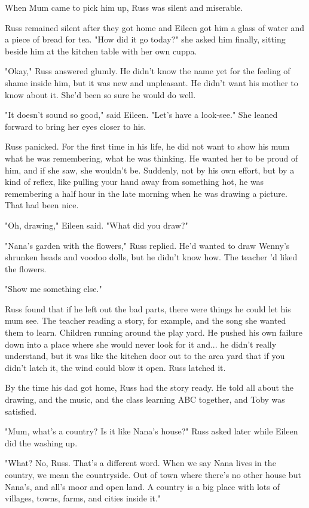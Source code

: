 \documentclass[a4paper,11pt]{article}
\begin{document}
When Mum came to pick him up, Russ was silent and miserable.

Russ remained silent after they got home and Eileen got him a glass of water and a piece of bread for tea. "How did it go today?" she asked him finally, sitting beside him at the kitchen table with her own cuppa.

"Okay," Russ answered glumly. He didn't know the name yet for the feeling of shame inside him, but it was new and unpleasant. He didn't want his mother to know about it. She'd been so sure he would do well.

"It doesn't sound so good," said Eileen. "Let's have a look-see." She leaned forward to bring her eyes closer to his.

Russ panicked. For the first time in his life, he did not want to show his mum what he was remembering, what he was thinking. He wanted her to be proud of him, and if she saw, she wouldn't be. Suddenly, not by his own effort, but by a kind of reflex, like pulling your hand away from something hot, he was remembering a half hour in the late morning when he was drawing a picture. That had been nice.

"Oh, drawing," Eileen said. "What did you draw?"

"Nana's garden with the flowers," Russ replied. He'd wanted to draw Wenny's shrunken heads and voodoo dolls, but he didn't know how. The teacher 'd liked the flowers.

"Show me something else."

Russ found that if he left out the bad parts, there were things he could let his mum see. The teacher reading a story, for example, and the song she wanted them to learn. Children running around the play yard. He pushed his own failure down into a place where she would never look for it and... he didn't really understand, but it was like the kitchen door out to the area yard that if you didn't latch it, the wind could blow it open. Russ latched it.

By the time his dad got home, Russ had the story ready. He told all about the drawing, and the music, and the class learning ABC together, and Toby was satisfied.

"Mum, what's a country? Is it like Nana's house?" Russ asked later while Eileen did the washing up.

"What? No, Russ. That's a different word. When we say Nana lives in the country, we mean the countryside. Out of town where there's no other house but Nana's, and all's moor and open land. A country is a big place with lots of villages, towns, farms, and cities inside it."
\end{document}
